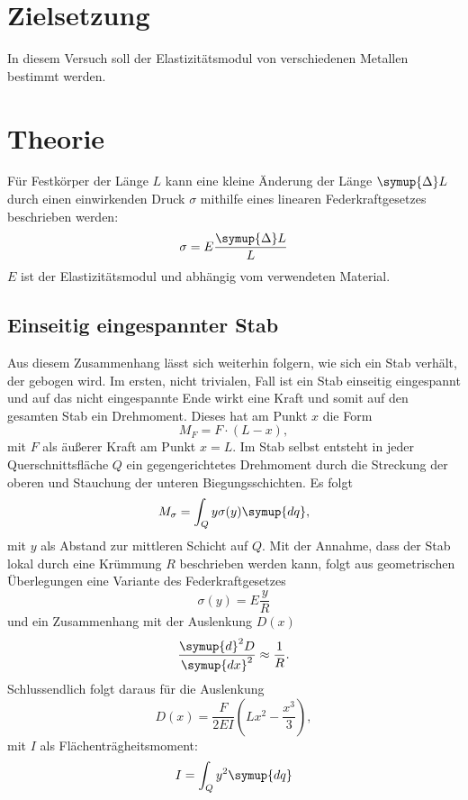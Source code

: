 \section{Zielsetzung}
In diesem Versuch soll der Elastizitätsmodul von verschiedenen Metallen bestimmt werden.
\section{Theorie}
\label{sec:Theorie}
Für Festkörper der Länge $L$ kann eine kleine Änderung der Länge $\symup{\Delta}L$
durch einen einwirkenden Druck $\sigma$
mithilfe eines linearen Federkraftgesetzes beschrieben werden:
\begin{equation}
    \sigma = E\frac{\symup{\Delta}L}{L}
\end{equation}
$E$ ist der Elastizitätsmodul und abhängig vom verwendeten Material.
\subsection{Einseitig eingespannter Stab}
Aus diesem Zusammenhang lässt sich weiterhin folgern, wie sich ein Stab verhält, der gebogen wird.
Im ersten, nicht trivialen, Fall ist ein Stab einseitig eingespannt und auf das nicht eingespannte
Ende wirkt eine Kraft und somit auf den gesamten Stab ein Drehmoment.
Dieses hat am Punkt $x$ die Form
\begin{equation}
    M_F = F\cdot(L-x),
\end{equation}
mit $F$ als äußerer Kraft am Punkt $x=L$.
Im Stab selbst entsteht in jeder Querschnittsfläche $Q$ ein gegengerichtetes Drehmoment durch die
Streckung der oberen und Stauchung der unteren Biegungsschichten.
Es folgt
\begin{equation}
    M_\sigma = \int_Q y \sigma(y) \symup{dq},
\end{equation}
mit $y$ als Abstand zur mittleren Schicht auf $Q$.
Mit der Annahme, dass der Stab lokal durch eine Krümmung $R$ beschrieben werden kann,
folgt aus geometrischen Überlegungen eine Variante des Federkraftgesetzes
\begin{equation}
    \sigma(y) = E\frac{y}{R}
\end{equation}
und ein Zusammenhang mit der Auslenkung $D(x)$
\begin{equation}
    \frac{\symup{d}^2D}{\symup{dx}^2} \approx \frac{1}{R}.
\end{equation}
Schlussendlich folgt daraus für die Auslenkung
\begin{equation}
  \label{eq:e_aus}
    D(x) = \frac{F}{2EI}\left(Lx^2-\frac{x^3}{3}\right),
\end{equation}
mit $I$ als Flächenträgheitsmoment:
\begin{equation}
    I = \int_Qy^2\symup{dq}
\end{equation}
